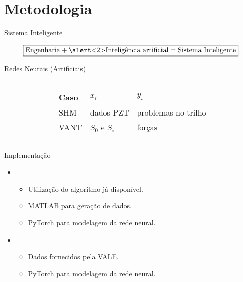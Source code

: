 \section{Metodologia}

\begin{frame}{Sistema Inteligente}

    \[\boxed{\text{Engenharia} + \text{\alert<2>{Inteligência artificial}}  = \text{Sistema Inteligente}}\] 
\end{frame}

\begin{frame}{Redes Neurais (Artificiais)}
\pause
\begin{columns}
\begin{figure}
    \centering
    
\end{figure}
\begin{table}
    \centering
    \begin{tabular}{|l|l|m{2cm}|}
        \hline
        Caso & \(x_i\)           & \(y_i\)             \\ \hline
        SHM  & dados PZT         & \alert<4>{problemas no trilho} \\ \hline
        VANT & \(S_0\) e \(S_i\) & forças     \\ \hline
    \end{tabular}
\end{table}
\end{columns}
\end{frame}

\begin{frame}{Implementação}
\pause
\begin{itemize}
    \item {}
        \begin{itemize}
            \item<3-> Utilização do algoritmo já disponível.
            \item<3-> MATLAB para geração de dados.
            \item<3-> PyTorch para modelagem da rede neural.
        \end{itemize}
    \item {}
    \begin{itemize}
        \item<4> Dados fornecidos pela VALE.
        \item<4> PyTorch para modelagem da rede neural.
    \end{itemize}
\end{itemize}
    
\end{frame}